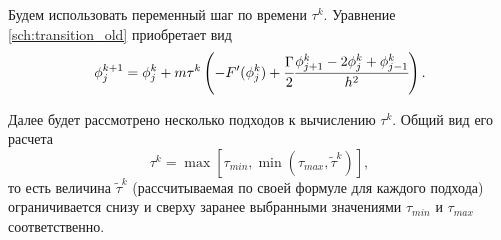 Будем использовать переменный шаг по времени $\tau^k$. Уравнение \ref{sch:transition_old} приобретает вид
\begin{equation}
	\phi_j^{k + 1} = \phi_j^k + m \tau^k \left( -F'(\phi_j^k) + \cfrac{\Gamma}{2} \cfrac{{\phi}_{j + 1}^k - 2 {\phi}_j^k + {\phi}_{j - 1}^k}{h^2} \right).
	\label{sch:transition}
\end{equation}

Далее будет рассмотрено несколько подходов к вычислению $\tau^k$. Общий вид его расчета
\[
	\tau^k = \max \left[ \tau_{min}, \min( \tau_{max}, \widetilde{\tau}^k) \right],
\]
то есть величина $\widetilde{\tau}^k$ (рассчитываемая по своей формуле для каждого подхода) ограничивается снизу и сверху заранее выбранными значениями $\tau_{min}$ и $\tau_{max}$ соответственно.